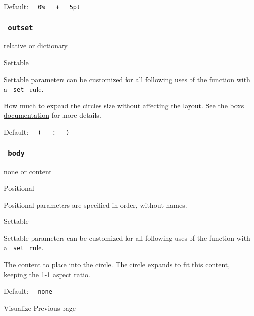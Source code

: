 Default:
\texttt{\ }{\texttt{\ 0\%\ }}\texttt{\ }{\texttt{\ +\ }}\texttt{\ }{\texttt{\ 5pt\ }}\texttt{\ }

\subsubsection{\texorpdfstring{\texttt{\ outset\ }}{ outset }}\label{parameters-outset}

\href{/docs/reference/layout/relative/}{relative} {or}
\href{/docs/reference/foundations/dictionary/}{dictionary}

{{ Settable }}

\label{parameters-outset-settable-tooltip}
Settable parameters can be customized for all following uses of the
function with a \texttt{\ set\ } rule.

How much to expand the circle\textquotesingle s size without affecting
the layout. See the
\href{/docs/reference/layout/box/\#parameters-outset}{box\textquotesingle s
documentation} for more details.

Default:
\texttt{\ }{\texttt{\ (\ }}\texttt{\ }{\texttt{\ :\ }}\texttt{\ }{\texttt{\ )\ }}\texttt{\ }

\subsubsection{\texorpdfstring{\texttt{\ body\ }}{ body }}\label{parameters-body}

\href{/docs/reference/foundations/none/}{none} {or}
\href{/docs/reference/foundations/content/}{content}

{{ Positional }}

\label{parameters-body-positional-tooltip}
Positional parameters are specified in order, without names.

{{ Settable }}

\label{parameters-body-settable-tooltip}
Settable parameters can be customized for all following uses of the
function with a \texttt{\ set\ } rule.

The content to place into the circle. The circle expands to fit this
content, keeping the 1-1 aspect ratio.

Default: \texttt{\ }{\texttt{\ none\ }}\texttt{\ }

\href{/docs/reference/visualize/}{\pandocbounded{}}

{ Visualize } { Previous page }


